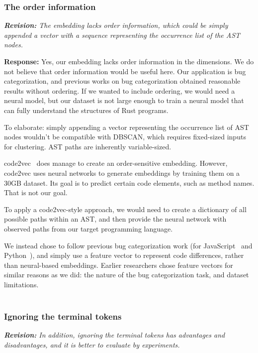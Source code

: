 \documentclass{article}
\begin{document}
\subsubsection{\label{rev:1:order}The order information}

\textit{\textbf{Revision:} The embedding lacks order information, which could be simply appended a vector with a sequence representing the occurrence list of the AST nodes.}

\textbf{Response:} Yes, our embedding lacks order information in the dimensions. We do not believe that order information would be useful here. Our application is bug categorization, and previous works on bug categorization obtained reasonable results without ordering. If we wanted to include ordering, we would need a neural model, but our dataset is not large enough to train a neural model that can fully understand the structures of Rust programs. 

To elaborate: simply appending a vector representing the occurrence list of AST nodes wouldn't be compatible with DBSCAN, which requires fixed-sized inputs for clustering. AST paths are inherently variable-sized.

code2vec~\cite{alon2019code2vec} does manage to create an order-sensitive embedding. However, code2vec uses neural networks to generate embeddings by training them on a 30GB dataset. Its goal is to predict certain code elements, such as method names. That is not our goal.

To apply a code2vec-style approach, we would need to create a dictionary of all possible paths within an AST, and then provide the neural network with observed paths from our target programming language.

We instead chose to follow previous bug categorization work (for JavaScript~\cite{hanam2016discovering} and Python~\cite{yang2022mining}), and simply use a feature vector to represent code differences, rather than neural-based embeddings. Earlier researchers chose feature vectors for similar reasons as we did: the nature of the bug categorization task, and dataset limitations. \\ \\

\subsubsection{\label{rev:1:terminal}Ignoring the terminal tokens}

\textit{\textbf{Revision:} In addition, ignoring the terminal tokens has advantages and disadvantages, and it is better to evaluate by experiments. }
\end{document}
